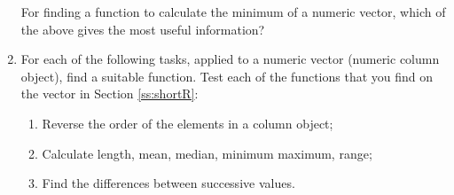 \begin{enumerate}
\begin{enumerate}
  \end{enumerate}
For finding a function to calculate the minimum of a numeric vector,
which of the above gives the most useful information?
\item For each of the following tasks, applied to a numeric vector
  (numeric column object), find a suitable function.  Test each of
  the functions that you find on the vector
   in Section \ref{ss:shortR}:\\
  \begin{enumerate}
    \item Reverse the order of the elements in a column object;
    \item Calculate length, mean, median, minimum maximum, range;
    \item Find the differences between successive values.
  \end{enumerate}
\end{enumerate}



